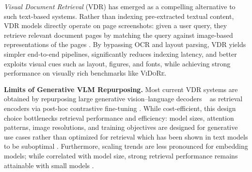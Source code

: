 \textit{Visual Document Retrieval} (VDR) has emerged as a compelling alternative to such text-based systems. Rather than indexing pre-extracted textual content, VDR models directly operate on page screenshots: given a user query, they retrieve relevant document pages by matching the query against image-based representations of the pages . By bypassing OCR and layout parsing, VDR yields simpler end-to-end pipelines, significantly reduces indexing latency, and better exploits visual cues such as layout, figures, and fonts, while achieving strong performance on visually rich benchmarks like \textsc{ViDoRe}. 

\textbf{Limits of Generative VLM Repurposing.} Most current VDR systems are obtained by repurposing large generative vision–language decoders ~ as retrieval encoders via post-hoc contrastive fine-tuning . While cost-efficient, this design choice bottlenecks retrieval performance and efficiency: model sizes, attention patterns, image resolutions, and training objectives are designed for generative use cases rather than optimized for retrieval which has been shown in text models to be suboptimal . Furthermore, scaling trends  are less pronounced for embedding models; while correlated with model size, strong retrieval performance remains attainable with small models .







